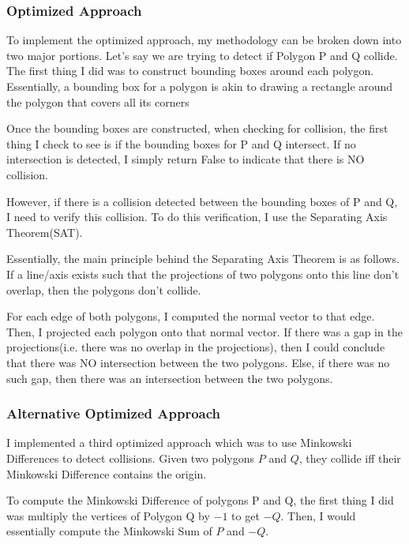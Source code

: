 \documentclass{article}
\begin{document}
\subsubsection{Optimized Approach}
To implement the optimized approach, my methodology can be broken down into two major portions. Let's say we are trying to detect if Polygon P and Q collide. The first thing I did was to construct bounding boxes around each polygon. Essentially, a bounding box for a polygon is akin to drawing a rectangle around the polygon that covers all its corners \newline 

Once the bounding boxes are constructed, when checking for collision, the first thing I check to see is if the bounding boxes for P and Q intersect. If no intersection is detected, I simply return False to indicate that there is NO collision. \newline 

However, if there is a collision detected between the bounding boxes of P and Q, I need to verify this collision. To do this verification, I use the Separating Axis Theorem(SAT). \newline 

Essentially, the main principle behind the Separating Axis Theorem is as follows. If a line/axis exists such that the projections of two polygons onto this line don't overlap, then the polygons don't collide. \newline 

For each edge of both polygons, I computed the normal vector to that edge. Then, I projected each polygon onto that normal vector. If there was a gap in the projections(i.e. there was no overlap in the projections), then I could conclude that there was NO intersection between the two polygons. Else, if there was no such gap, then there was an intersection between the two polygons. 

\subsubsection{Alternative Optimized Approach}
I implemented a third optimized approach which was to use Minkowski Differences to detect collisions. Given two polygons $P$ and $Q$, they collide iff their Minkowski Difference contains the origin. \newline 

To compute the Minkowski Difference of polygons P and Q, the first thing I did was multiply the vertices of Polygon Q by $-1$ to get $-Q$. Then, I would essentially compute the Minkowski Sum of $P$ and $-Q$. \newline 
\end{document}
